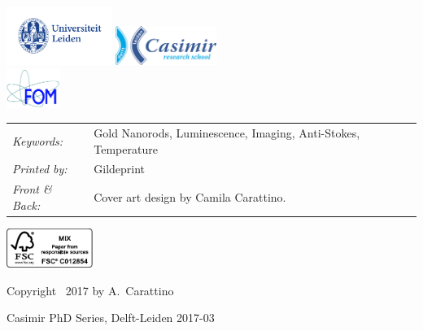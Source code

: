 \begin{titlepage}
\medskip

\vfill
\begin{center}
    \includegraphics[height=0.75in]{title/logos/leiden}
    \hspace{2em}
    \includegraphics[height=0.5in]{title/logos/casimir} \\
    \includegraphics[height=0.5in]{title/logos/fom}
\end{center}
\vfill

\noindent
\begin{tabular}{@{}p{}@{}p{}}
    \textit{Keywords:} & Gold Nanorods, Luminescence, Imaging,
    Anti-Stokes, Temperature
    \\[\medskipamount] \textit{Printed by:} & Gildeprint \\[\medskipamount]
    \textit{Front \& Back:} & Cover art design by Camila Carattino.
\end{tabular}

\vspace{2\bigskipamount}

\includegraphics[height=0.5in]{title/logos/fsc}

\vspace{1\bigskipamount}

\noindent Copyright \textcopyright\ 2017 by A.~Carattino

\noindent Casimir PhD Series, Delft-Leiden 2017-03


\end{titlepage}
